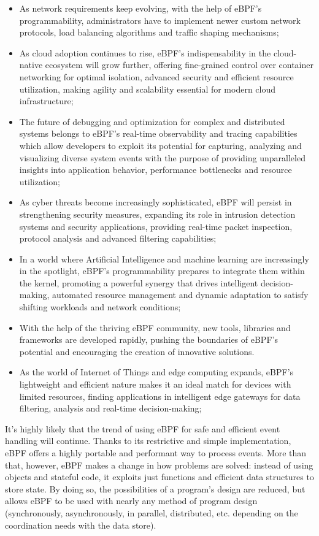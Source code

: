 \begin{itemize}
	\item 
		As network requirements keep evolving, with the help of eBPF's programmability, administrators have to implement newer custom network protocols, load balancing algorithms and traffic shaping mechanisms;
	\item 
		As cloud adoption continues to rise, eBPF's indispensability in the cloud-native ecosystem will grow further, offering fine-grained control over container networking for optimal isolation, advanced security and efficient resource utilization, making agility and scalability essential for modern cloud infrastructure;
	\item 
		The future of debugging and optimization for complex and distributed systems belongs to eBPF's real-time observability and tracing capabilities which allow developers to exploit its potential for capturing, analyzing and visualizing diverse system events with the purpose of providing unparalleled insights into application behavior, performance bottlenecks and resource utilization;
	\item 
		As cyber threats become increasingly sophisticated, eBPF will persist in strengthening security measures, expanding its role in intrusion detection systems and security applications, providing real-time packet inspection, protocol analysis and advanced filtering capabilities;
	\item 
		In a world where Artificial Intelligence and machine learning are increasingly in the spotlight, eBPF's programmability prepares to integrate them within the kernel, promoting a powerful synergy that drives intelligent decision-making, automated resource management and dynamic adaptation to satisfy shifting workloads and network conditions;
	\item 
		With the help of the thriving eBPF community, new tools, libraries and frameworks are developed rapidly, pushing the boundaries of eBPF's potential and encouraging the creation of innovative solutions.
	\item 
		As the world of Internet of Things and edge computing expands, eBPF's lightweight and efficient nature makes it an ideal match for devices with limited resources, finding applications in intelligent edge gateways for data filtering, analysis and real-time decision-making;
\end{itemize}

It’s highly likely that the trend of using eBPF for safe and efficient event handling will continue.
Thanks to its restrictive and simple implementation, eBPF offers a highly portable and performant way to process events. 
More than that, however, eBPF makes a change in how problems are solved: instead of using objects and stateful code, it exploits just functions and efficient data structures to store state. 
By doing so, the possibilities of a program’s design are reduced, but allows eBPF to be used with nearly any method of program design (synchronously, asynchronously, in parallel, distributed, etc. depending on the coordination needs with the data store).

